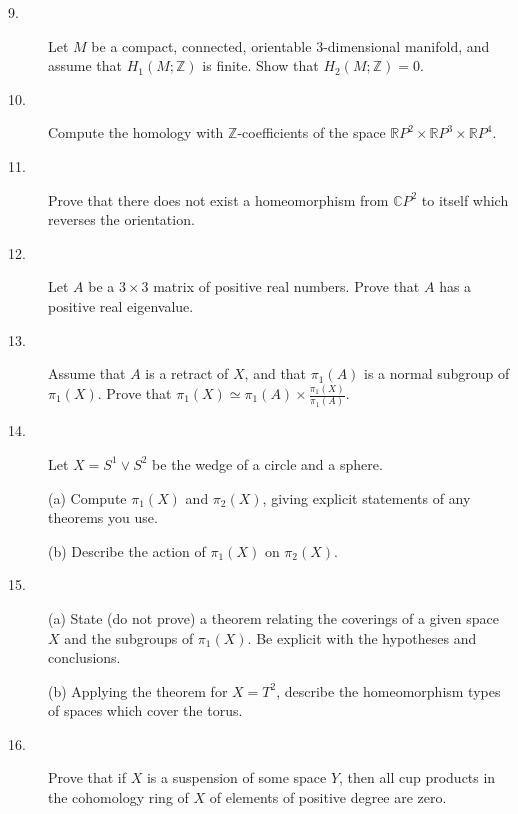 \documentclass{article}
\def\R{\mathbb R}
\def\C{\mathbb C}
\def\Z{\mathbb Z}
\begin{document}
\begin{description}
\item[9.]
Let $M$ be a compact, connected, orientable 3-dimensional manifold, and
assume that $H_1(M; \Z)$ is finite. Show that $H_2 (M;\Z) = 0$.

\item[10.]
Compute the homology with $\Z$-coefficients of the space
$\R P^2 \times \R P^3 \times \R P^4$.

\item[11.]
Prove that there does not exist a homeomorphism from $\C P^2$ to itself
which reverses the orientation.

\item[12.]
Let $A$ be a $ 3 \times 3$ matrix of positive real numbers. Prove that $A$
has a positive real eigenvalue.

\item[13.]
Assume that $A$ is a retract of $X$, and that $\pi_1(A)$ is a normal
subgroup of $\pi_1(X)$. Prove that
$\pi_1(X) \simeq \pi_1 (A) \times \frac{\pi_1(X)}{\pi_1(A)}$.

\item[14.]
Let $X=S^1 \vee S^2$ be the wedge of a circle and a sphere.

\item[\quad] (a)
Compute $\pi_1(X)$ and $\pi_2(X)$, giving explicit statements of any
theorems you use.

\item[\quad] (b)
Describe the action of $\pi_1(X)$ on $\pi_2(X)$.

\item[15.] (a)
State (do not prove) a theorem relating the coverings of a given space $X$
and the subgroups of $\pi_1(X)$. Be explicit with the hypotheses and
conclusions.

\item[\quad] (b)
Applying the theorem for $X = T^2$, describe the homeomorphism types of
spaces which cover the torus.

\item[16.]
Prove that if $X$ is a suspension of some space $Y$, then all cup products
in the cohomology ring of $X$ of elements of positive degree
are zero.






\end{description}    
\end{document}
